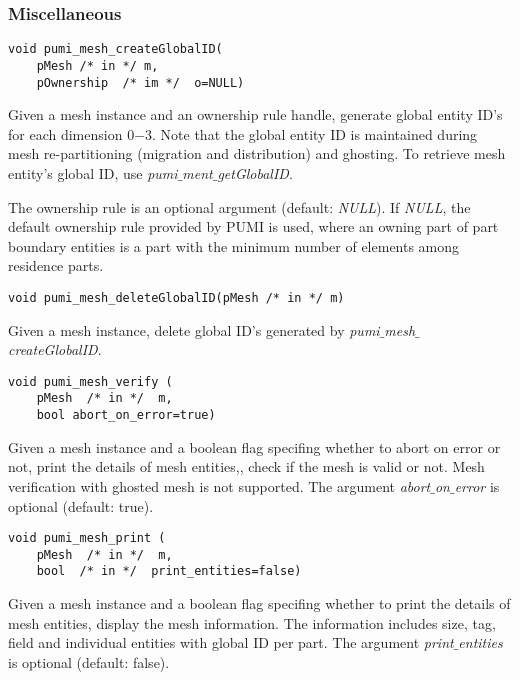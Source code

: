 \subsubsection{Miscellaneous}\label{sec:meshmisc}

\begin{verbatim}
void pumi_mesh_createGlobalID(
    pMesh /* in */ m, 
    pOwnership  /* im */  o=NULL)
\end{verbatim}\vspace{-.5cm}\hspace{1cm}
Given a mesh instance and an ownership rule handle, generate global entity ID's for each dimension $0$$-$$3$. Note that the global entity ID is maintained during mesh re-partitioning (migration and distribution) and ghosting. To retrieve mesh entity's global ID, use \emph{pumi$\_$ment$\_$getGlobalID}.

The ownership rule is an optional argument (default: \emph{NULL}). If \emph{NULL}, the default ownership rule provided by PUMI is used, where an owning part of part boundary entities is a part with the minimum number of elements among residence parts. 

\begin{verbatim}
void pumi_mesh_deleteGlobalID(pMesh /* in */ m)
\end{verbatim}\vspace{-.5cm}\hspace{1cm}
Given a mesh instance, delete global ID's generated by \emph{pumi$\_$mesh$\_$createGlobalID}.

\begin{verbatim}
void pumi_mesh_verify (
    pMesh  /* in */  m,
    bool abort_on_error=true)
\end{verbatim}\vspace{-.5cm}\hspace{1cm}
        Given a mesh instance and a boolean flag specifing whether to abort on error or not, print the details of mesh entities,, check if the mesh is valid or not. Mesh verification with ghosted mesh is not supported. The argument \emph{abort$\_$on$\_$error} is optional (default: true).

\begin{verbatim}
void pumi_mesh_print (
    pMesh  /* in */  m,
    bool  /* in */  print_entities=false)
\end{verbatim}\vspace{-.5cm}\hspace{1cm}
        Given a mesh instance and a boolean flag specifing whether to print the details of mesh entities, display the mesh information. The information includes size, tag, field and individual entities with global ID per part. The argument \emph{print$\_$entities} is optional (default: false).

